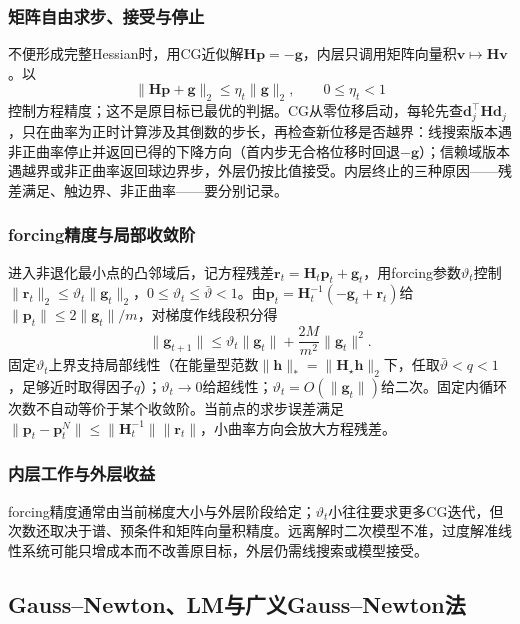 \subsubsection{矩阵自由求步、接受与停止}

不便形成完整Hessian时，用CG近似解$\bm H\bm p=-\bm g$，内层只调用矩阵向量积$\bm v\mapsto\bm H\bm v$。以
\[
 \|\bm H\bm p+\bm g\|_2\leq\eta_t\|\bm g\|_2,\qquad 0\leq\eta_t<1
\]
控制方程精度；这不是原目标已最优的判据。CG从零位移启动，每轮先查$\bm d_j^\top\bm H\bm d_j$，只在曲率为正时计算涉及其倒数的步长，再检查新位移是否越界：线搜索版本遇非正曲率停止并返回已得的下降方向（首内步无合格位移时回退$-\bm g$）；信赖域版本遇越界或非正曲率返回球边界步，外层仍按比值接受。内层终止的三种原因——残差满足、触边界、非正曲率——要分别记录。

\subsubsection{forcing精度与局部收敛阶}

进入非退化最小点的凸邻域后，记方程残差$\bm r_t=\bm H_t\bm p_t+\bm g_t$，用forcing参数$\vartheta_t$控制$\|\bm r_t\|_2\leq\vartheta_t\|\bm g_t\|_2$，$0\leq\vartheta_t\leq\bar\vartheta<1$。由$\bm p_t=\bm H_t^{-1}(-\bm g_t+\bm r_t)$给$\|\bm p_t\|\leq2\|\bm g_t\|/m$，对梯度作线段积分得
\begin{equation}
 \|\bm g_{t+1}\|\leq\vartheta_t\|\bm g_t\|
 +\frac{2M}{m^2}\|\bm g_t\|^2.
 \label{eq:opt-inexact-newton}
\end{equation}
固定$\vartheta_t$上界支持局部线性（在能量型范数$\|\bm h\|_*=\|\bm H_\star\bm h\|_2$下，任取$\bar\vartheta<q<1$，足够近时取得因子$q$）；$\vartheta_t\to0$给超线性；$\vartheta_t=O(\|\bm g_t\|)$给二次。固定内循环次数不自动等价于某个收敛阶。当前点的求步误差满足$\|\bm p_t-\bm p_t^N\|\leq\|\bm H_t^{-1}\|\|\bm r_t\|$，小曲率方向会放大方程残差。

\subsubsection{内层工作与外层收益}

forcing精度通常由当前梯度大小与外层阶段给定；$\vartheta_t$小往往要求更多CG迭代，但次数还取决于谱、预条件和矩阵向量积精度。远离解时二次模型不准，过度解准线性系统可能只增成本而不改善原目标，外层仍需线搜索或模型接受。

\subsection{Gauss--Newton、LM与广义Gauss--Newton法}

